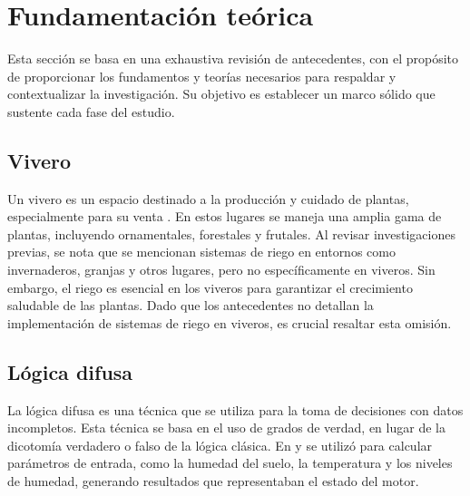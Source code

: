 \section{Fundamentación teórica}

Esta sección se basa en una exhaustiva revisión de antecedentes, con el
propósito de proporcionar los fundamentos y teorías necesarios para respaldar y
contextualizar la investigación. Su objetivo es establecer un marco sólido que
sustente cada fase del estudio.

\subsection{Vivero}
Un vivero es un espacio destinado a la producción y cuidado de plantas, especialmente para su venta \cite{peris_para_nodate}. En estos lugares se maneja una amplia gama de plantas, incluyendo ornamentales, forestales y frutales. Al revisar investigaciones previas, se nota que se mencionan sistemas de riego en entornos como invernaderos, granjas y otros lugares, pero no específicamente en viveros. Sin embargo, el riego es esencial en los viveros para garantizar el crecimiento saludable de las plantas. Dado que los antecedentes no detallan la implementación de sistemas de riego en viveros, es crucial resaltar esta omisión.

\subsection{Lógica difusa}
La lógica difusa es una técnica que se utiliza para la toma de decisiones con datos incompletos. Esta técnica se basa en el uso de grados de verdad, en lugar de la dicotomía verdadero o falso de la lógica clásica. En \cite{lema_holguin_implementacion_2018} \cite{salazar_irrigation_2013} \cite{hasan_implementation_2018} \cite{munir_intelligent_2019} \cite{al-ali_iot-solar_2019} \cite{krishnan_fuzzy_2020} \cite{kumar_irrigation_2020} \cite{benyezza_zoning_2021} \cite{noauthor_fuzzy_2023} \cite{neugebauer_fuzzy_2023} y \cite{mohammed_intelligent_nodate}  se utilizó para calcular parámetros de entrada, como la humedad del suelo, la temperatura y los niveles de humedad, generando resultados que representaban el estado del motor.

